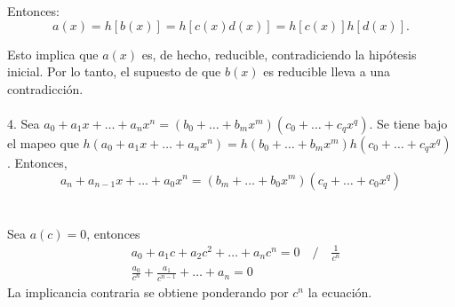 \documentclass{article}
\begin{document}
Entonces:
\[
a(x) = h[b(x)] = h[c(x)d(x)] = h[c(x)]h[d(x)].
\]

Esto implica que \( a(x) \) es, de hecho, reducible, contradiciendo la hipótesis inicial. Por lo tanto, el supuesto de que \( b(x) \) es reducible lleva a una contradicción.
\\
\\
4. Sea $a_{0}+a_{1}x+\dots+a_{n}x^{n}=(b_{0}+\dots+b_{m}x^{m})(c_{0}+\dots+c_{q}x^{q})$. Se tiene bajo el mapeo que $h(a_{0}+a_{1}x+\dots+a_{n}x^{n})=h(b_{0}+\dots+b_{m}x^{m})h(c_{0}+\dots+c_{q}x^{q})$. Entonces,
\begin{equation*}
    a_{n}+a_{n-1}x+\dots+a_{0}x^{n}=(b_{m}+\dots+b_{0}x^{m})(c_{q}+\dots+c_{0}x^{q})
\end{equation*}
\\
\\
Sea $a(c)=0$, entonces \begin{equation*}
\begin{aligned}
    &a_{0} + a_{1}c + a_{2}c^{2} + \dots + a_{n}c^{n} = 0 \quad / \quad \frac{1}{c^{n}} \\
    &\frac{a_{0}}{c^{n}} + \frac{a_{1}}{c^{n-1}} + \dots + a_{n} = 0
\end{aligned}
\end{equation*}
La implicancia contraria se obtiene ponderando por $c^{n}$ la ecuación.
\end{document}

